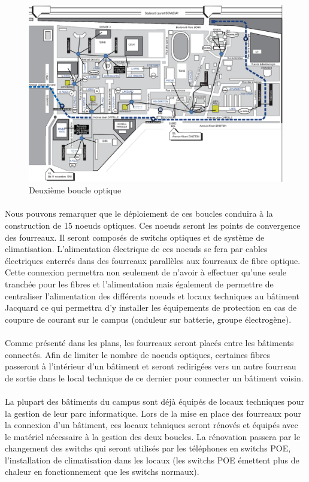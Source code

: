 \begin{figure}[h]
  \caption{\label{Plan_boucle2} Deuxième boucle optique}
  \includegraphics[scale=0.6]{Boucle2.png}
\end{figure}
\newpage

\paragraph{} Nous pouvons remarquer que le déploiement de ces boucles conduira à la construction de 15 noeuds optiques. Ces noeuds seront les points de convergence des fourreaux. Il seront composés de switchs optiques et de système de climatisation. L'alimentation électrique de ces noeuds se fera par cables électriques enterrés dans des fourreaux parallèles aux fourreaux de fibre optique. Cette connexion permettra non seulement de n'avoir à effectuer qu'une seule tranchée pour les fibres et l'alimentation mais également de permettre de centraliser l'alimentation des différents noeuds et locaux techniques au bâtiment Jacquard ce qui permettra d'y installer les équipements de protection en cas de coupure de courant sur le campus (onduleur sur batterie, groupe électrogène).
\paragraph{} Comme présenté dans les plans, les fourreaux seront placés entre les bâtiments connectés. Afin de limiter le nombre de noeuds optiques, certaines fibres passeront à l'intérieur d'un bâtiment et seront redirigées vers un autre fourreau de sortie dans le local technique de ce dernier pour connecter un bâtiment voisin. 
\paragraph{} La plupart des bâtiments du campus sont déjà équipés de locaux techniques pour la gestion de leur parc informatique. Lors de la mise en place des fourreaux pour la connexion d'un bâtiment, ces locaux tehniques seront rénovés et équipés avec le matériel nécessaire à la gestion des deux boucles. La rénovation passera par le changement des switchs qui seront utilisés par les téléphones en switchs POE, l'installation de climatisation dans les locaux (les switchs POE émettent plus de chaleur en fonctionnement que les switchs normaux).
